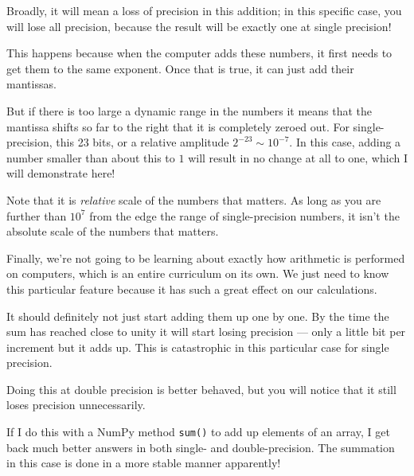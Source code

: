 
\begin{answer}
Broadly, it will mean a loss of precision in this addition; in this
specific case, you will lose all precision, because the result will be
exactly one at single precision!

This happens because when the computer adds these numbers, it first
needs to get them to the same exponent. Once that is true, it can just
add their mantissas. 

But if there is too large a dynamic range in the numbers it means that
the mantissa shifts so far to the right that it is completely zeroed
out. For single-precision, this 23 bits, or a relative amplitude
$2^{-23} \sim 10^{-7}$. In this case, adding a number smaller than
about this to $1$ will result in no change at all to one, which I will
demonstrate here!

Note that it is {\it relative} scale of the numbers that matters. As
long as you are further than $10^7$ from the edge the range of
single-precision numbers, it isn't the absolute scale of the numbers
that matters.

Finally, we're not going to be learning about exactly how arithmetic
is performed on computers, which is an entire curriculum on its own.
We just need to know this particular feature because it has such a
great effect on our calculations.
\end{answer}

  
\begin{answer}
It should definitely not just start adding them up one by one. By the
time the sum has reached close to unity it will start losing precision
--- only a little bit per increment but it adds up. This is
catastrophic in this particular case for single precision.

Doing this at double precision is better behaved, but you will notice
that it still loses precision unnecessarily.

If I do this with a NumPy method {\tt sum()} to add up elements of an
array, I get back much better answers in both single- and
double-precision. The summation in this case is done in a more stable
manner apparently!
\end{answer}

